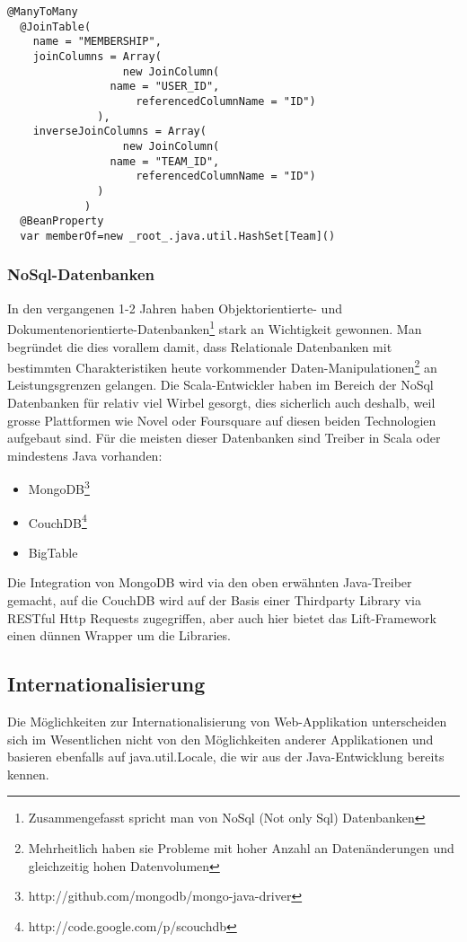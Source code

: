 \begin{lstlisting}[caption=Relation Mapping mit JPA]
@ManyToMany
  @JoinTable(
    name = "MEMBERSHIP",
    joinColumns = Array(
    			  new JoinColumn(
			    name = "USER_ID", 
    			    referencedColumnName = "ID")
			  ),
    inverseJoinColumns = Array(
    			  new JoinColumn(
  		  	    name = "TEAM_ID",
    			    referencedColumnName = "ID")
			  )
			)
  @BeanProperty
  var memberOf=new _root_.java.util.HashSet[Team]()
  \end{lstlisting}
  
\subsubsection{NoSql-Datenbanken}
In den vergangenen 1-2 Jahren haben Objektorientierte- und Dokumentenorientierte-Datenbanken\footnote{Zusammengefasst spricht man von NoSql (Not only Sql) Datenbanken} stark an Wichtigkeit gewonnen. Man\cite{wiki:NoSQL} begr\"undet die dies vorallem damit, dass Relationale Datenbanken mit bestimmten Charakteristiken heute vorkommender Daten-Manipulationen\footnote{Mehrheitlich haben sie Probleme mit hoher Anzahl an Daten\"anderungen und gleichzeitig hohen Datenvolumen} an Leistungsgrenzen gelangen.
Die Scala-Entwickler haben im Bereich der NoSql Datenbanken f\"ur relativ viel Wirbel gesorgt, dies sicherlich auch deshalb, weil grosse Plattformen wie Novel oder Foursquare auf diesen beiden Technologien aufgebaut sind. F\"ur die meisten dieser Datenbanken sind Treiber in Scala oder mindestens Java vorhanden:
\begin{itemize}
\item MongoDB\footnote{http://github.com/mongodb/mongo-java-driver}
\item CouchDB\footnote{http://code.google.com/p/scouchdb}
\item BigTable
\end{itemize}

Die Integration von MongoDB wird via den oben erw\"ahnten Java-Treiber gemacht, auf die CouchDB wird auf der Basis einer Thirdparty Library via RESTful Http Requests zugegriffen, aber auch hier bietet das Lift-Framework einen d\"unnen Wrapper um die Libraries.

\subsection{Internationalisierung}
Die M\"oglichkeiten zur Internationalisierung von Web-Applikation unterscheiden sich im Wesentlichen nicht von den M\"oglichkeiten anderer Applikationen und basieren ebenfalls auf java.util.Locale, die wir aus der Java-Entwicklung bereits kennen. 

